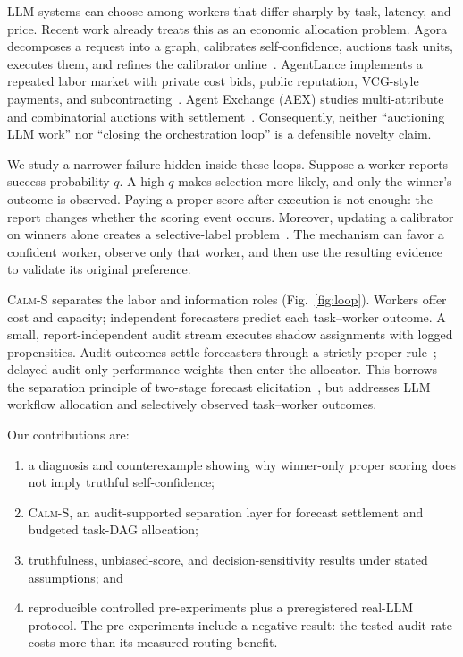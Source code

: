 \documentclass[sigconf,anonymous,review]{acmart}
\newcommand{\calms}{\textsc{Calm-S}}
\begin{document}
LLM systems can choose among workers that differ sharply by task, latency, and
price. Recent work already treats this as an economic allocation problem. Agora
decomposes a request into a graph, calibrates self-confidence, auctions task
units, executes them, and refines the calibrator online~\cite{zhou2026agora}.
AgentLance implements a repeated labor market with private cost bids, public
reputation, VCG-style payments, and subcontracting~\cite{liu2026agentlance}.
Agent Exchange (AEX) studies multi-attribute and combinatorial auctions with
settlement~\cite{yang2025aex}. Consequently, neither ``auctioning LLM work'' nor
``closing the orchestration loop'' is a defensible novelty claim.

We study a narrower failure hidden inside these loops. Suppose a worker reports
success probability $q$. A high $q$ makes selection more likely, and only the
winner's outcome is observed. Paying a proper score after execution is not enough:
the report changes whether the scoring event occurs. Moreover, updating a
calibrator on winners alone creates a selective-label problem~\cite{lakkaraju2017selective}.
The mechanism can favor a confident worker, observe only that worker, and then use
the resulting evidence to validate its original preference.

\calms{} separates the labor and information roles (Fig.~\ref{fig:loop}). Workers
offer cost and capacity; independent forecasters predict each task--worker
outcome. A small, report-independent audit stream executes shadow assignments
with logged propensities. Audit outcomes settle forecasters through a strictly
proper rule~\cite{gneiting2007proper}; delayed audit-only performance weights then
enter the allocator. This borrows the separation principle of two-stage forecast
elicitation~\cite{papakonstantinou2008truthful}, but addresses LLM workflow
allocation and selectively observed task--worker outcomes.

Our contributions are:
\begin{enumerate}
  \item a diagnosis and counterexample showing why winner-only proper scoring
  does not imply truthful self-confidence;
  \item \calms{}, an audit-supported separation layer for forecast settlement and
  budgeted task-DAG allocation;
  \item truthfulness, unbiased-score, and decision-sensitivity results under
  stated assumptions; and
  \item reproducible controlled pre-experiments plus a preregistered real-LLM
  protocol. The pre-experiments include a negative result: the tested audit rate
  costs more than its measured routing benefit.
\end{enumerate}
\end{document}
